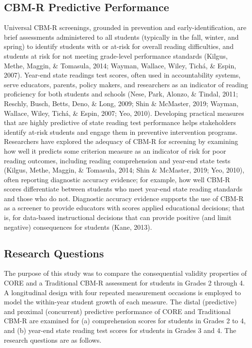 \documentclass[
  english,
  man, fleqn, noextraspace]{apa6}
\begin{document}
\hypertarget{cbm-r-predictive-performance}{%
\subsection{CBM-R Predictive Performance}\label{cbm-r-predictive-performance}}

Universal CBM-R screenings, grounded in prevention and early-identification, are brief assessments administered to all students (typically in the fall, winter, and spring) to identify students with or at-risk for overall reading difficulties, and students at risk for not meeting grade-level performance standards (Kilgus, Methe, Maggin, \& Tomasula, 2014; Wayman, Wallace, Wiley, Tichá, \& Espin, 2007). Year-end state readings test scores, often used in accountability systems, serve educators, parents, policy makers, and researchers as an indicator of reading proficiency for both students and schools (Nese, Park, Alonzo, \& Tindal, 2011; Reschly, Busch, Betts, Deno, \& Long, 2009; Shin \& McMaster, 2019; Wayman, Wallace, Wiley, Tichá, \& Espin, 2007; Yeo, 2010). Developing practical measures that are highly predictive of state reading test performance helps stakeholders identify at-risk students and engage them in preventive intervention programs. Researchers have explored the adequacy of CBM-R for screening by examining how well it predicts some criterion measure as an indicator of risk for poor reading outcomes, including reading comprehension and year-end state tests (Kilgus, Methe, Maggin, \& Tomasula, 2014; Shin \& McMaster, 2019; Yeo, 2010), often reporting diagnostic accuracy evidence; for example, how well CBM-R scores differentiate between students who meet year-end state reading standards and those who do not. Diagnostic accuracy evidence supports the use of CBM-R as a screener to provide educators with scores applied educational decisions; that is, for data-based instructional decisions that can provide positive (and limit negative) consequences for students (Kane, 2013).

\hypertarget{research-questions}{%
\subsection{Research Questions}\label{research-questions}}

The purpose of this study was to compare the consequential validity properties of CORE and a Traditional CBM-R assessment for students in Grades 2 through 4. A longitudinal design with four repeated measurement occasions is employed to model the within-year student growth of each measure. The distal (predictive) and proximal (concurrent) predictive performance of CORE and Traditional CBM-R are examined for (a) comprehension scores for students in Grades 2 to 4, and (b) year-end state reading test scores for students in Grades 3 and 4. The research questions are as follows.
\end{document}
